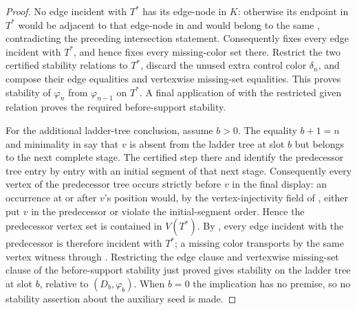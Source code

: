 \begin{proof}
No edge incident with \(T^*\) has its edge-node in \(K\): otherwise its
endpoint in \(T^*\) would be adjacent to that edge-node in
 and would belong to the same
, contradicting the preceding intersection
statement.  Consequently  fixes every edge
incident with \(T^*\), and hence fixes every missing-color set there.
Restrict the two certified stability relations to \(T^*\), discard the
unused extra control color \(\delta_n\), and compose their edge equalities
and vertexwise missing-set equalities.  This proves stability of
\(\varphi_n\) from \(\varphi_{n-1}\) on \(T^*\).  A final application of
 with the restricted given relation proves the required
before-support stability.

For the additional ladder-tree conclusion, assume \(b>0\).  The equality
\(b+1=n\) and minimality in  say that
\(v\) is absent from the ladder tree at slot \(b\) but belongs to the next
complete stage.  The certified step there and
 identify the predecessor tree entry by
entry with an initial segment of that next stage.  Consequently every
vertex of the predecessor tree occurs strictly before \(v\) in the final
display: an occurrence at or after \(v\)'s position would, by the
vertex-injectivity field of , either put \(v\) in the
predecessor or violate the initial-segment order.  Hence the predecessor
vertex set is contained in \(V(T^*)\).  By
, every edge incident with the predecessor is
therefore incident with \(T^*\); a missing color transports by the same
vertex witness through .  Restricting the edge
clause and vertexwise missing-set clause of the before-support stability
just proved gives stability on the ladder tree at slot \(b\), relative to
\((D_b,\varphi_b)\).  When \(b=0\) the implication has no premise, so no
stability assertion about the auxiliary seed is made.
\end{proof}
